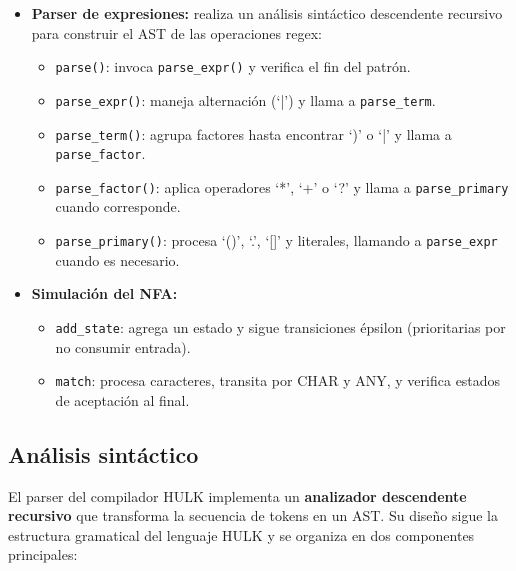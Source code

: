 \documentclass{article}
\begin{document}
\begin{itemize}
  \item \textbf{Parser de expresiones:} realiza un análisis sintáctico descendente recursivo para construir el AST de las operaciones regex:
  \begin{itemize}
    \item \texttt{parse()}: invoca \texttt{parse\_expr()} y verifica el fin del patrón.
    \item \texttt{parse\_expr()}: maneja alternación (`|') y llama a \texttt{parse\_term}.
    \item \texttt{parse\_term()}: agrupa factores hasta encontrar `)' o `|' y llama a \texttt{parse\_factor}.
    \item \texttt{parse\_factor()}: aplica operadores `*', `+' o `?' y llama a \texttt{parse\_primary} cuando corresponde.
    \item \texttt{parse\_primary()}: procesa `()', `.', `[]' y literales, llamando a \texttt{parse\_expr} cuando es necesario.
  \end{itemize}
  
  \item \textbf{Simulación del NFA:}
  \begin{itemize}
    \item \texttt{add\_state}: agrega un estado y sigue transiciones épsilon (prioritarias por no consumir entrada).
    \item \texttt{match}: procesa caracteres, transita por CHAR y ANY, y verifica estados de aceptación al final.
  \end{itemize}
\end{itemize}

\subsection{Análisis sintáctico}

El parser del compilador HULK implementa un \textbf{analizador descendente recursivo} que transforma la secuencia de tokens en un AST. Su diseño sigue la estructura gramatical del lenguaje HULK y se organiza en dos componentes principales:
\end{document}
